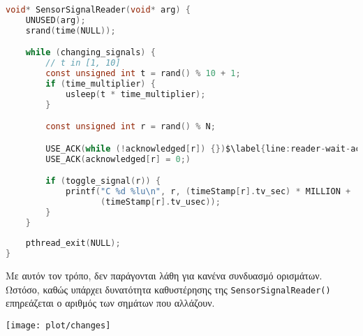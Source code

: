 \begin{lstlisting}[language=c, caption={SensorSignalReader() με χρήση array acknowledged}, escapechar=$, label={lst:reader-ack}]
void* SensorSignalReader(void* arg) {
    UNUSED(arg);
    srand(time(NULL));

    while (changing_signals) {
        // t in [1, 10]
        const unsigned int t = rand() % 10 + 1;
        if (time_multiplier) {
            usleep(t * time_multiplier);
        }

        const unsigned int r = rand() % N;

        USE_ACK(while (!acknowledged[r]) {})$\label{line:reader-wait-ack}$
        USE_ACK(acknowledged[r] = 0;)

        if (toggle_signal(r)) {
            printf("C %d %lu\n", r, (timeStamp[r].tv_sec) * MILLION +
                   (timeStamp[r].tv_usec));
        }
    }
    
    pthread_exit(NULL);
}
\end{lstlisting}

Με αυτόν τον τρόπο, δεν παράγονται λάθη για κανένα συνδυασμό ορισμάτων.
Ωστόσο, καθώς υπάρχει δυνατότητα καθυστέρησης της \lstinline!SensorSignalReader()! επηρεάζεται ο αριθμός των σημάτων που αλλάζουν.

\begin{center}
	\texttt{[image: plot/changes]}
\end{center}
